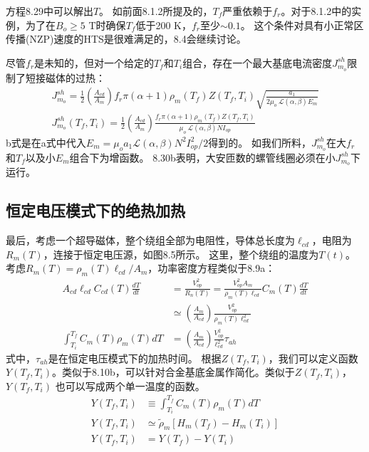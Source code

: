 方程8.29中可以解出$T$。
如前面8.1.2所提及的，$T_f$严重依赖于$f_r$。对于8.1.2中的实例，为了在$B_o\ge 5$ T时确保$T_f$低于200 K，$f_r$至少$\sim 0.1$。
这个条件对具有小正常区传播(NZP)速度的HTS是很难满足的，8.4会继续讨论。

尽管$f_r$是未知的，但对一个给定的$T_f$和$T_i$组合，存在一个最大基底电流密度$J_{m_o}^{sh}$限制了短接磁体的过热：
\begin{subequations}%
	\begin{align}
J_{m_o}^{sh}=\frac{1}{2}\left(\frac{A_{cd}}{A_m}\right)f_r\pi(\alpha+1)\rho_m(T_f)Z(T_f,T_i)\sqrt{\frac{a_1}{2\mu_o\ \mathcal{L}(\alpha,\beta)E_m}}\\
J_{m_o}^{sh}(T_f,T_i)=\frac{1}{2}\left(\frac{A_{cd}}{A_m}\right)\frac{f_r\pi(\alpha+1)\rho_m(T_f)Z(T_f,T_i)}{\mu_o\ \mathcal{L}(\alpha,\beta)NI_{op}}
\end{align}
\end{subequations}
b式是在a式中代入$E_m=\mu_o a_1\mathcal{L}(\alpha,\beta)N^2 I_{op}^2/2$得到的。
如我们所料，$J_{m_o}^{sh}$在大$f_r$和$T_f$以及小$E_m$组合下为增函数。
8.30b表明，大安匝数的螺管线圈必须在小$J_{m_o}^{sh}$下运行。


\subsection{恒定电压模式下的绝热加热}
最后，考虑一个超导磁体，整个绕组全部为电阻性，导体总长度为$\ell_{cd}$，电阻为$R_m(T)$，连接于恒定电压源，如图8.5所示。
这里，整个绕组的温度为$T(t)$。
考虑$R_m(T)=\rho_m(T)\ell_{cd}/A_m$，功率密度方程类似于8.9a：
\begin{subequations}%
	\begin{align}
A_{cd}\ell_{cd}C_{cd}(T)\frac{dT}{dt}&=\frac{V_{op}^{2}}{R_n(T)}=\frac{V_{op}^{2}A_m}{\rho_m(T)\ell_{cd}}
C_m(T)\frac{dT}{dt}\\
&\simeq\left(\frac{A_m}{A_{cd}}\right)\frac{V_{op}^{2}}{\rho_m(T)\ell_{cd}^{2}}\\
\int_{T_i}^{T_f}C_m(T)\rho_m(T)dT&=\left(\frac{A_m}{A_{cd}}\right)\frac{V_{op}^{2}}{\ell_{cd}^{2}}\tau_{ah}
\end{align}
\end{subequations}
式中，$\tau_{ah}$是在恒定电压模式下的加热时间。
根据$Z(T_f,T_i)$，我们可以定义函数$Y(T_f,T_i)$。类似于8.10b，可以针对合金基底金属作简化。类似于$Z(T_f,T_i)$，$Y(T_f,T_i)$
也可以写成两个单一温度的函数。
\begin{subequations}%
	\begin{align}
Y(T_f,T_i)&\equiv\int_{T_i}^{T_f}C_m(T)\rho_m(T)dT\\
Y(T_f,T_i)&\simeq\tilde{\rho}_m[H_m(T_f)-H_m(T_i)]\\
Y(T_f,T_i)&=Y(T_f)-Y(T_i)
\end{align}
\end{subequations}

